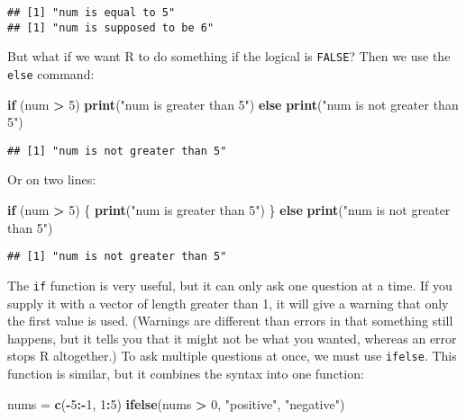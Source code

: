 \documentclass[]{book}
\newenvironment{Shaded}{\begin{snugshade}}{\end{snugshade}}
\newcommand{\KeywordTok}[1]{\textcolor[rgb]{0.13,0.29,0.53}{\textbf{#1}}}
\newcommand{\DecValTok}[1]{\textcolor[rgb]{0.00,0.00,0.81}{#1}}
\newcommand{\StringTok}[1]{\textcolor[rgb]{0.31,0.60,0.02}{#1}}
\newcommand{\ControlFlowTok}[1]{\textcolor[rgb]{0.13,0.29,0.53}{\textbf{#1}}}
\newcommand{\OperatorTok}[1]{\textcolor[rgb]{0.81,0.36,0.00}{\textbf{#1}}}
\newcommand{\NormalTok}[1]{#1}
\theoremstyle{definition}
\theoremstyle{definition}
\theoremstyle{definition}
\theoremstyle{remark}
\begin{document}
\begin{verbatim}
## [1] "num is equal to 5"
## [1] "num is supposed to be 6"
\end{verbatim}

But what if we want R to do something if the logical is \texttt{FALSE}?
Then we use the \texttt{else} command:

\begin{Shaded}
\begin{Highlighting}[]
\ControlFlowTok{if}\NormalTok{ (num }\OperatorTok{>}\StringTok{ }\DecValTok{5}\NormalTok{) }\KeywordTok{print}\NormalTok{(}\StringTok{"num is greater than 5"}\NormalTok{) }\ControlFlowTok{else} \KeywordTok{print}\NormalTok{(}\StringTok{"num is not greater than 5"}\NormalTok{)}
\end{Highlighting}
\end{Shaded}

\begin{verbatim}
## [1] "num is not greater than 5"
\end{verbatim}

Or on two lines:

\begin{Shaded}
\begin{Highlighting}[]
\ControlFlowTok{if}\NormalTok{ (num }\OperatorTok{>}\StringTok{ }\DecValTok{5}\NormalTok{) \{}
  \KeywordTok{print}\NormalTok{(}\StringTok{"num is greater than 5"}\NormalTok{)}
\NormalTok{\} }\ControlFlowTok{else} \KeywordTok{print}\NormalTok{(}\StringTok{"num is not greater than 5"}\NormalTok{)}
\end{Highlighting}
\end{Shaded}

\begin{verbatim}
## [1] "num is not greater than 5"
\end{verbatim}

The \texttt{if} function is very useful, but it can only ask one
question at a time. If you supply it with a vector of length greater
than 1, it will give a warning that only the first value is used.
(Warnings are different than errors in that something still happens, but
it tells you that it might not be what you wanted, whereas an error
stops R altogether.) To ask multiple questions at once, we must use
\texttt{ifelse}. This function is similar, but it combines the syntax
into one function:

\begin{Shaded}
\begin{Highlighting}[]
\NormalTok{nums =}\StringTok{ }\KeywordTok{c}\NormalTok{(}\OperatorTok{-}\DecValTok{5}\OperatorTok{:-}\DecValTok{1}\NormalTok{, }\DecValTok{1}\OperatorTok{:}\DecValTok{5}\NormalTok{)}
\KeywordTok{ifelse}\NormalTok{(nums }\OperatorTok{>}\StringTok{ }\DecValTok{0}\NormalTok{, }\StringTok{"positive"}\NormalTok{, }\StringTok{"negative"}\NormalTok{)}
\end{Highlighting}
\end{Shaded}
\end{document}

